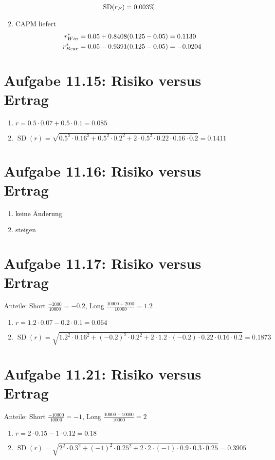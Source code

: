 \documentclass{article}
\DeclareMathOperator{\SD}{SD}
\begin{document}
\begin{enumerate}[label=(\alph*)]
\begin{align}
			\SD(r_P) &= 0.003\% \notag
		\end{align}
		\item CAPM liefert
		\begin{align}
			r_{Win}^\ast &= 0.05 + 0.8408(0.125-0.05) = 0.1130 \notag \\
			r_{Bear}^\ast &= 0.05 - 0.9391(0.125-0.05) = -0.0204 \notag
		\end{align}
	\end{enumerate}

	\section*{Aufgabe 11.15: Risiko versus Ertrag}
	\begin{enumerate}[label=(\alph*)]
		\item $r=0.5\cdot 0.07 + 0.5\cdot 0.1=0.085$
		\item $\SD(r)=\sqrt{0.5^2\cdot 0.16^2 + 0.5^2\cdot 0.2^2 + 2\cdot 0.5^2\cdot 0.22\cdot 0.16\cdot 0.2} = 0.1411$
	\end{enumerate}

	\section*{Aufgabe 11.16: Risiko versus Ertrag}
	\begin{enumerate}[label=(\alph*)]
		\item keine Änderung
		\item steigen
	\end{enumerate}

	\section*{Aufgabe 11.17: Risiko versus Ertrag}
	Anteile: Short $\frac{-2000}{10000} = -0.2$, Long $\frac{10000 + 2000}{10000} = 1.2$
	\begin{enumerate}[label=(\alph*)]
		\item $r=1.2\cdot 0.07 - 0.2\cdot 0.1=0.064$
		\item $\SD(r)=\sqrt{1.2^2\cdot 0.16^2 + (-0.2)^2\cdot 0.2^2 + 2\cdot 1.2\cdot (-0.2)\cdot 0.22\cdot 0.16\cdot 0.2} = 0.1873$
	\end{enumerate}

	\section*{Aufgabe 11.21: Risiko versus Ertrag}
	Anteile: Short $\frac{-10000}{10000} = -1$, Long $\frac{10000 + 10000}{10000} = 2$
	\begin{enumerate}[label=(\alph*)]
		\item $r=2\cdot 0.15 - 1\cdot 0.12=0.18$
		\item $\SD(r)=\sqrt{2^2\cdot 0.3^2 + (-1)^2\cdot 0.25^2 + 2\cdot 2\cdot (-1)\cdot 0.9\cdot 0.3\cdot 0.25} = 0.3905$
	\end{enumerate}
	
\end{document}
